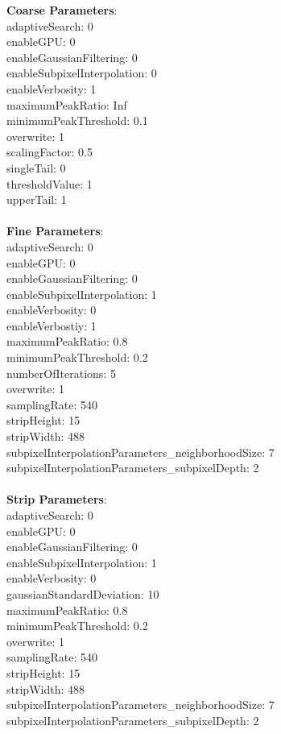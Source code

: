 \documentclass[11pt]{article}
\begin{document}
\textbf{Coarse Parameters}: \\
adaptiveSearch: 0\\
enableGPU: 0\\
enableGaussianFiltering: 0\\
enableSubpixelInterpolation: 0\\
enableVerbosity: 1\\
maximumPeakRatio: Inf\\
minimumPeakThreshold: 0.1\\
overwrite: 1\\
scalingFactor: 0.5\\
singleTail: 0\\
thresholdValue: 1\\
upperTail: 1\\
\\
\textbf{Fine Parameters}: \\
adaptiveSearch: 0\\
enableGPU: 0\\
enableGaussianFiltering: 0\\
enableSubpixelInterpolation: 1\\
enableVerbosity: 0\\
enableVerbostiy: 1\\
maximumPeakRatio: 0.8\\
minimumPeakThreshold: 0.2\\
numberOfIterations: 5\\
overwrite: 1\\
samplingRate: 540\\
stripHeight: 15\\
stripWidth: 488\\
subpixelInterpolationParameters\_neighborhoodSize: 7\\
subpixelInterpolationParameters\_subpixelDepth: 2\\
\\
\textbf{Strip Parameters}: \\
adaptiveSearch: 0\\
enableGPU: 0\\
enableGaussianFiltering: 0\\
enableSubpixelInterpolation: 1\\
enableVerbosity: 0\\
gaussianStandardDeviation: 10\\
maximumPeakRatio: 0.8\\
minimumPeakThreshold: 0.2\\
overwrite: 1\\
samplingRate: 540\\
stripHeight: 15\\
stripWidth: 488\\
subpixelInterpolationParameters\_neighborhoodSize: 7\\
subpixelInterpolationParameters\_subpixelDepth: 2\\
\\
\newpage
\end{document}
